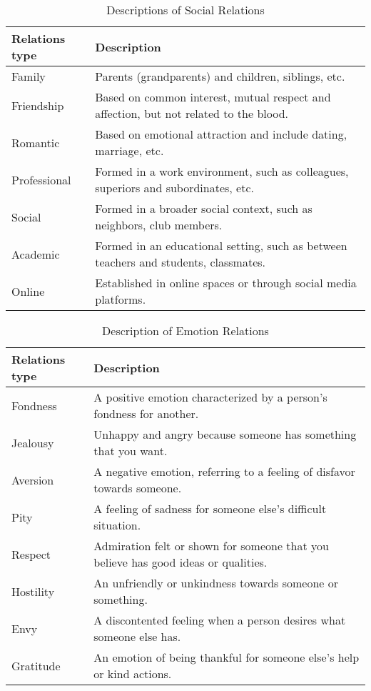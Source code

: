 \documentclass[letterpaper]{article} %
\begin{document}
\begin{itemize}
\begin{table*}[ht]
\begin{tabular}{ll}
      \hline
      \textbf{Relations type} & \textbf{Description}\\
      \hline
      Family & Parents (grandparents) and children, siblings, etc.\\
      \hline
      Friendship & Based on common interest, mutual respect and affection, but not related to the blood.\\
      \hline
      Romantic & Based on emotional attraction and include dating, marriage, etc.\\
      \hline
      Professional & Formed in a work environment, such as colleagues, superiors and subordinates, etc.\\ 
      \hline
      Social & Formed in a broader social context, such as neighbors, club members.\\
      \hline
      Academic & Formed in an educational setting, such as between teachers and students, classmates.\\
      \hline
      Online & Established in online spaces or through social media platforms.\\
      \hline
    \end{tabular}
    \caption{Descriptions of Social Relations}
    \label{table:social}
    \end{table*}
    
    \begin{table*}[ht]
      \small
      \centering
      \begin{tabular}{ll}
        \hline
        \textbf{Relations type} & \textbf{Description}\\
        \hline
        Fondness & A positive emotion characterized by a person's fondness for another.\\
        \hline
        Jealousy & Unhappy and angry because someone has something that you want.\\
        \hline
        Aversion  & A negative emotion, referring to a feeling of disfavor towards someone.\\
        \hline
        Pity  & A feeling of sadness for someone else's difficult situation.\\ 
        \hline
        Respect & Admiration felt or shown for someone that you believe has good ideas or qualities.\\
        \hline
        Hostility  & An unfriendly or unkindness towards someone or something.\\
        \hline
        Envy & A discontented feeling when a person desires what someone else has.\\
        \hline
        Gratitude & An emotion of being thankful for someone else's help or kind actions.\\
        \hline
      \end{tabular}
      \caption{Description of Emotion Relations}
      \label{table:emotional}  
    \end{table*}


\end{itemize}
\end{document}
